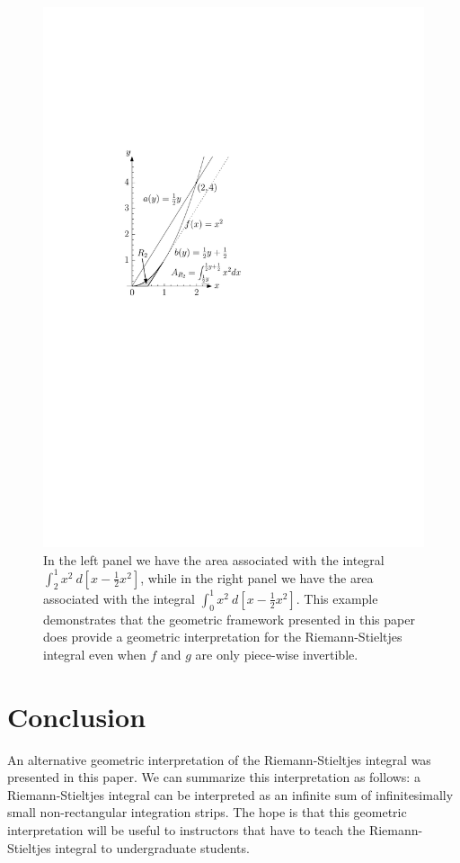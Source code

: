 \documentclass{article}
\theoremstyle{theorem}
\theoremstyle{definition}
\begin{document}
\begin{figure}
\begin{minipage}{.5\textwidth}
  \includegraphics[width=0.9\linewidth]{fig20c.pdf}
\end{minipage}
\caption{In the left panel we have the area associated with the integral $\int_2^1 x^2~d[x-\frac{1}{2}x^2]$, while in the 
right panel we have the area associated with the integral $\int_0^1 x^2~d[x-\frac{1}{2}x^2]$. This example demonstrates
that the geometric framework presented in this paper does provide a geometric interpretation for the Riemann-Stieltjes integral
even when $f$ and $g$ are only piece-wise invertible.}
\label{fig:ex4_sec}
\end{figure}

\section{Conclusion}
An alternative geometric interpretation of the Riemann-Stieltjes integral was presented in this paper. We can summarize this 
interpretation as follows: a Riemann-Stieltjes integral can be interpreted as an infinite sum of infinitesimally small non-rectangular 
integration strips. The hope is that this geometric interpretation will be useful to instructors that have to teach
the Riemann-Stieltjes integral to undergraduate students. 
\end{document}
